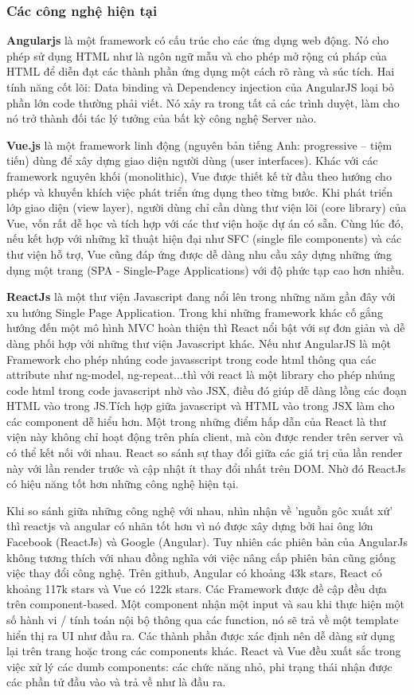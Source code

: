 \subsubsection{Các công nghệ hiện tại}
\textbf{Angularjs} là một framework có cấu trúc cho các ứng dụng web động. Nó cho phép sử dụng HTML như là ngôn ngữ mẫu và cho phép mở rộng cú pháp của HTML để diễn đạt các thành phần ứng dụng một cách rõ ràng và súc tích. Hai tính năng cốt lõi: Data binding và Dependency injection của AngularJS loại bỏ phần lớn code thường phải viết. Nó xảy ra trong tất cả các trình duyệt, làm cho nó trở thành đối tác lý tưởng của bất kỳ công nghệ Server nào.

\textbf{Vue.js} là một framework linh động (nguyên bản tiếng Anh: progressive – tiệm tiến) dùng để xây dựng giao diện người dùng (user interfaces). Khác với các framework nguyên khối (monolithic), Vue được thiết kế từ đầu theo hướng cho phép và khuyến khích việc phát triển ứng dụng theo từng bước. Khi phát triển lớp giao diện (view layer), người dùng chỉ cần dùng thư viện lõi (core library) của Vue, vốn rất dễ học và tích hợp với các thư viện hoặc dự án có sẵn. Cùng lúc đó, nếu kết hợp với những kĩ thuật hiện đại như SFC (single file components) và các thư viện hỗ trợ, Vue cũng đáp ứng được dễ dàng nhu cầu xây dựng những ứng dụng một trang (SPA - Single-Page Applications) với độ phức tạp cao hơn nhiều.

\textbf{ReactJs} là một thư viện Javascript đang nổi lên trong những năm gần đây với xu hướng Single Page Application. Trong khi những framework khác cố gắng hướng đến một mô hình MVC hoàn thiện thì React nổi bật với sự đơn giản và dễ dàng phối hợp với những thư viện Javascript khác. Nếu như AngularJS là một Framework cho phép nhúng code javasscript trong code html thông qua các attribute như ng-model, ng-repeat...thì với react là một library cho phép nhúng code html trong code javascript nhờ vào JSX, điều đó giúp dễ dàng lồng các đoạn HTML vào trong JS.Tích hợp giữa javascript và HTML vào trong JSX làm cho các component dễ hiểu hơn. Một trong những điểm hấp dẫn của React là thư viện này không chỉ hoạt động trên phía client, mà còn được render trên server và có thể kết nối với nhau. React so sánh sự thay đổi giữa các giá trị của lần render này với lần render trước và cập nhật ít thay đổi nhất trên DOM. Nhờ đó ReactJs có hiệu năng tốt hơn những công nghệ hiện tại.

Khi so sánh giữa những công nghệ với nhau, nhìn nhận về 'nguồn gôc xuất xứ' thì reactjs và angular có nhãn tốt hơn vì nó được xây dựng bởi hai ông lớn Facebook (ReactJs) và Google (Angular). Tuy nhiên các phiên bản của AngularJs không tương thích với nhau đồng nghĩa với việc nâng cấp phiên bản cũng giống việc thay đổi công nghệ. Trên github, Angular có khoảng 43k stars, React có khoảng 117k stars và Vue có 122k stars. Các Framework được đề cập đều dựa trên component-based. Một component nhận một input và sau khi thực hiện một số hành vi / tính toán nội bộ thông qua các function, nó sẽ trả về một template hiển thị ra UI như đầu ra. Các thành phần được xác định nên dễ dàng sử dụng lại trên trang hoặc trong các components khác. React và Vue đều xuất sắc trong việc xử lý các dumb components: các chức năng nhỏ, phi trạng thái nhận được các phần tử đầu vào và trả về như là đầu ra.

